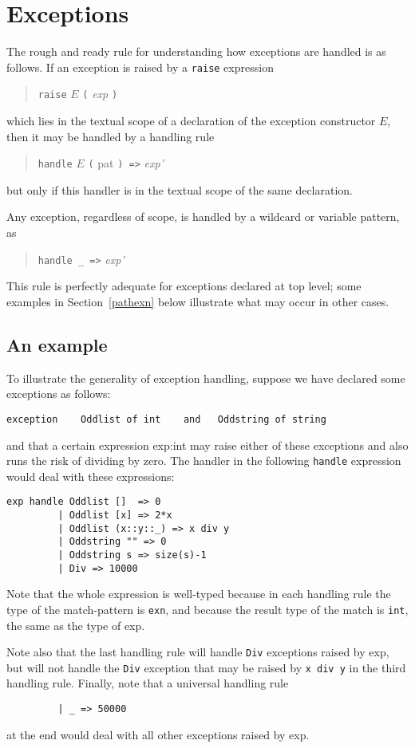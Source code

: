 \chapter{Exceptions}
\label{exception}
The rough and ready rule for understanding how exceptions are handled
is as follows.  If an exception is raised by a \verb"raise"
expression
\begin{quote}
\verb"raise" $E$ \verb"(" {\it exp} \verb")"
\end{quote}
which lies in the textual scope of a declaration of the exception
constructor $E$, then it may be handled by a handling rule
\begin{quote}
\verb"handle" $E$ \verb"(" pat \verb") =>" {\it exp'}
\end{quote}
but only if this handler is in the textual scope of the same
declaration.

Any exception, regardless of scope, is handled by a wildcard or
variable pattern, as
\begin{quote}
\verb"handle _ =>" {\it exp'}
\end{quote}
This rule is perfectly adequate for exceptions declared at top level;
some examples in Section~\ref{pathexn} below illustrate what may occur in other
cases.

\section{An example}
To illustrate the generality of exception handling,  suppose we have
declared some exceptions as follows:
\begin{verbatim}
exception    Oddlist of int    and   Oddstring of string
\end{verbatim}
and that a certain expression  exp:int  may raise either of these
exceptions and also runs the risk of dividing by zero.  The handler
in the following \verb"handle" expression would deal with these
expressions:
\begin{verbatim}
exp handle Oddlist []  => 0
         | Oddlist [x] => 2*x
         | Oddlist (x::y::_) => x div y
         | Oddstring "" => 0
         | Oddstring s => size(s)-1
         | Div => 10000
\end{verbatim}
Note that the whole expression is well-typed because in each handling
rule the type of the match-pattern is \verb"exn", and because the
result type of the match is \verb"int", the same as the type of exp.

Note also that the last handling rule will handle \verb"Div"
exceptions raised by exp, but will not handle the \verb"Div"
exception that may be raised by \verb"x div y" in the third handling
rule.  Finally, note that a universal handling rule
\begin{verbatim}
         | _ => 50000
\end{verbatim}
at the end would deal with all other exceptions raised by  exp.

